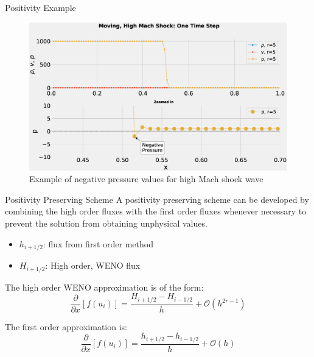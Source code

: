 \documentclass[10pt]{beamer}
\begin{document}
\begin{frame}{Positivity Example}
  \begin{figure}[H]
    \centering
    \includegraphics[scale=0.275]{PositivityZoom.eps}\caption{Example of negative pressure values for high Mach shock wave}
    \end{figure}
\end{frame}






\begin{frame}{Positivity Preserving Scheme}
  A positivity preserving scheme can be developed by combining the high order fluxes with the first order fluxes whenever necessary to prevent the solution from obtaining unphysical values.
  \begin{itemize}
    \item $h_{i+1/2}$: flux from first order method
    \item $H_{i+1/2}$: High order, WENO flux
  \end{itemize}
  
  The high order WENO approximation is of the form:
  $$
  \frac{\partial}{\partial x}[f(u_i)] = \frac{H_{i+1 /2} - H_{i-1/2}}{h}+\mathcal{O}(h^{2r-1})
  $$

  The first order approximation is:
  $$
  \frac{\partial}{\partial x}[f(u_i)] = \frac{h_{i+1 /2} - h_{i-1/2}}{h}+\mathcal{O}(h)
  $$
\end{frame}
\end{document}
